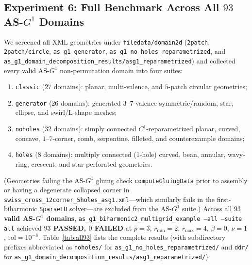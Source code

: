 \documentclass[11pt,a4paper]{article}
\begin{document}
\subsection{Experiment 6: Full Benchmark Across All $93$ \texorpdfstring{AS-$G^1$}{AS-G1} Domains}
We screened all XML geometries under \texttt{filedata/domain2d} (\texttt{2patch}, \texttt{2patch/circle}, \texttt{as\_g1\_generator}, \texttt{as\_g1\_no\_holes\_reparametrized}, and \texttt{as\_g1\_domain\_decomposition\_results/asg1\_reparametrized}) and collected every valid AS-$G^1$ non-permutation domain into four suites:
\begin{enumerate}
    \item \texttt{classic} ($27$ domains): planar, multi-valence, and $5$-patch circular geometries;
    \item \texttt{generator} ($26$ domains): generated $3$--$7$-valence symmetric/random, star, ellipse, and swirl/L-shape meshes;
    \item \texttt{noholes} ($32$ domains): simply connected $C^1$-reparametrized planar, curved, concave, $1$--$7$-corner, comb, serpentine, filleted, and counterexample domains;
    \item \texttt{holes} ($8$ domains): multiply connected (1-hole) curved, bean, annular, wavy-ring, crescent, and star-perforated geometries.
\end{enumerate}
(Geometries failing the AS-$G^1$ gluing check \texttt{computeGluingData} prior to assembly or having a degenerate collapsed corner in \texttt{swiss\_cross\_12corner\_5holes\_asg1.xml}---which similarly fails in the first-biharmonic \texttt{SparseLU} solver---are excluded from the AS-$G^1$ suite.) Across all \textbf{$93$ valid AS-$G^1$ domains}, \texttt{as\_g1\_biharmonic2\_multigrid\_example --all --suite all} achieved \textbf{$93$ PASSED, $0$ FAILED} at $p=3$, $r_{\min}=2$, $r_{\max}=4$, $\beta=0$, $\nu=1$, $\mathrm{tol}=10^{-8}$. Table~\ref{tab:all93} lists the complete results (with subdirectory prefixes abbreviated as \texttt{noholes/} for \texttt{as\_g1\_no\_holes\_reparametrized/} and \texttt{ddr/} for \texttt{as\_g1\_domain\_decomposition\_results/asg1\_reparametrized/}).
\end{document}
